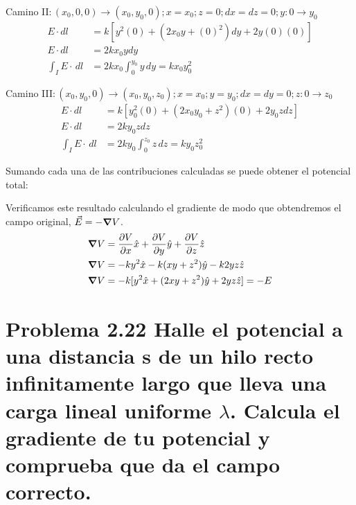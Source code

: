 \documentclass{article}
\newcommand{\problema}[2]{%
  \vspace{0.5cm}
  {\noindent\textbf{Problema #1} #2} 
  \noindent 
}
\begin{document}
Camino II$: (x_{0},0,0) \rightarrow (x_{0},y_{0},0);x = x_{0} ; z=0 ; dx=dz=0; y:0\rightarrow y_{0}$
\begin{align*}
  E \cdot dl &= k[y^2 (0) + (2x_{0}y+{(0)}^2)dy + 2y(0)(0)] \\
  E \cdot dl &= 2kx_{0}y dy \\
  \int_{I}^{} E\cdot\,dl &= 2kx_{0} \int_{0}^{y_{0}} y\,dy = kx_{0}y_{0}^2
\end{align*}

Camino III$: (x_{0},y_{0},0) \rightarrow (x_{0},y_{0},z_{0}); x = x_{0};y = y_{0} ; dx=dy=0; z:0\rightarrow z_{0}$
\begin{align*}
  E \cdot dl &= k[y_{0}^2 (0) + (2x_{0}y_{0}+z^2)(0) + 2y_{0}zdz] \\
  E \cdot dl &= 2ky_{0}z dz \\
  \int_{I}^{} E\cdot\,dl &= 2ky_{0} \int_{0}^{z_{0}} z\,dz = ky_{0}z_{0}^2
\end{align*}

Sumando cada una de las contribuciones calculadas se puede obtener el potencial total:
\begin{center}
\end{center}

Verificamos este resultado calculando el gradiente de modo que obtendremos el campo original, $\vec{E} = -\grad{V}$.
\begin{align*}
  \grad{V} &= \frac{\partial V}{\partial x}\hat{x} +\frac{\partial V}{\partial y}\hat{y} + \frac{\partial V}{\partial z}\hat{z}\\
  \grad{V} &= -k y^2\hat{x} - k(x y+z^2)\hat{y} - k2yz\hat{z}\\
  \grad{V} &= -k[y^2\hat{x} + (2xy+z^2)\hat{y} + 2yz\hat{z}] = -E
\end{align*}

\begin{center}
\end{center}

\section*{\problema{2.22}{Halle el potencial a una distancia s de un hilo recto infinitamente largo que lleva una carga lineal uniforme $\lambda$.
Calcula el gradiente de tu potencial y comprueba que da el campo correcto.}}
\end{document}
